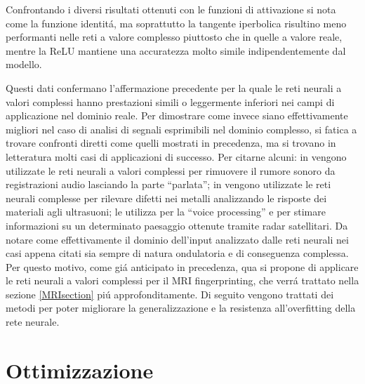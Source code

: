 \documentclass[a4paper,10pt]{article}
\begin{document}
 Confrontando i diversi risultati ottenuti con le funzioni di attivazione si nota come la funzione identit\'a, ma soprattutto la tangente iperbolica risultino meno performanti nelle reti a valore complesso piuttosto che in quelle a valore reale, mentre la ReLU mantiene una accuratezza molto simile indipendentemente dal modello.
 
 Questi dati confermano l'affermazione precedente per la quale le reti neurali a valori complessi hanno prestazioni simili o leggermente inferiori nei campi di applicazione nel dominio reale. Per dimostrare come invece siano effettivamente migliori nel caso di analisi di segnali esprimibili nel dominio complesso, si fatica a trovare confronti diretti come quelli mostrati in precedenza, ma si trovano in letteratura molti casi di applicazioni di successo. Per citarne alcuni: in \cite{sarroff} vengono utilizzate le reti neurali a valori complessi per rimuovere il rumore sonoro da registrazioni audio lasciando la parte ``parlata''; in \cite{birx1993complex} vengono utilizzate le reti neurali complesse per rilevare difetti nei metalli analizzando le risposte dei materiali agli ultrasuoni; \cite{sawada2003polar} le utilizza per la ``voice processing'' e \cite{yamaki2008singular}  per stimare informazioni su un determinato paesaggio ottenute tramite radar satellitari. Da notare come effettivamente il dominio dell'input analizzato dalle reti neurali nei casi appena citati sia sempre di natura ondulatoria e di conseguenza complessa. Per questo motivo, come gi\'a anticipato in precedenza, qua si propone di applicare le reti neurali a valori complessi per il MRI fingerprinting, che verr\'a trattato nella sezione \ref{MRIsection} pi\'u approfonditamente. 
 Di seguito vengono trattati dei metodi per poter migliorare la generalizzazione e la resistenza all'overfitting della rete neurale.



 



 
 \section{Ottimizzazione}
\end{document}
